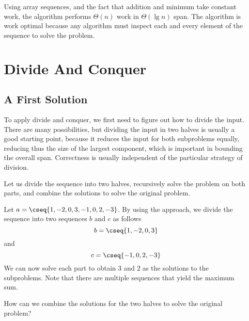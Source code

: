 \begin{gram}

Using array sequences, and the fact that addition and minimum take
constant work, the algorithm performs $\Theta(n)$ work in $\Theta(\lg
n)$ span.  
%
The algorithm is work optimal because any algorithm must inspect each
and every element of the sequence to solve the \MCSS{} problem.
\end{gram}

\section{Divide And Conquer}
\label{sec:mcss::dc}

\subsection{A First Solution}
\label{sec:mcss::dc::first}

\begin{flex}
\begin{gram}
To apply divide and conquer, we first need to figure out how to divide the input.
%
There are many possibilities, but dividing the input in two halves is
usually a good starting point, because it reduces the input for both
subproblems equally, reducing thus the size of the largest component,
which is important in bounding the overall span.
%
Correctness is usually independent of the particular strategy of
division.
%

Let us divide the sequence into two halves, recursively solve the
problem on both parts, and combine the solutions to solve the original
problem.
\end{gram}

\begin{example}
\label{ex:mcss1}
Let $a = \cseq{1, -2, 0, 3, -1, 0, 2, -3}$.  By using the approach, we
divide the sequence into two sequences $b$ and $c$ as follows
\[
b = \cseq{1, -2, 0, 3}
\]
and
\[
c = \cseq{-1, 0, 2, -3}
\]
%
We can now solve each part to obtain $3$ and $2$ as the solutions to
the subproblems.
%
Note that there are multiple sequences that yield the maximum sum.  
\end{example}
\end{flex}

\begin{teachask}
How can we combine the solutions for the two halves to solve the
original problem?
\end{teachask}
%

